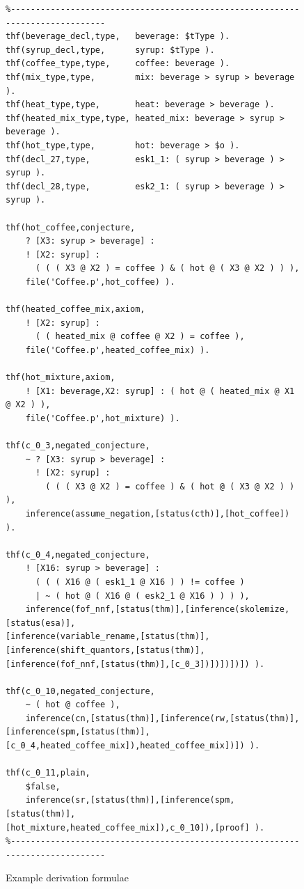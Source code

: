 \documentclass{easychair}
\begin{document}
\begin{figure}[htb]
{\footnotesize
{\setlength{\baselineskip}{3mm}
\begin{verbatim}
%------------------------------------------------------------------------------
thf(beverage_decl,type,   beverage: $tType ).
thf(syrup_decl,type,      syrup: $tType ).
thf(coffee_type,type,     coffee: beverage ).
thf(mix_type,type,        mix: beverage > syrup > beverage ).
thf(heat_type,type,       heat: beverage > beverage ).
thf(heated_mix_type,type, heated_mix: beverage > syrup > beverage ).
thf(hot_type,type,        hot: beverage > $o ).
thf(decl_27,type,         esk1_1: ( syrup > beverage ) > syrup ).
thf(decl_28,type,         esk2_1: ( syrup > beverage ) > syrup ).

thf(hot_coffee,conjecture,
    ? [X3: syrup > beverage] :
    ! [X2: syrup] :
      ( ( ( X3 @ X2 ) = coffee ) & ( hot @ ( X3 @ X2 ) ) ),
    file('Coffee.p',hot_coffee) ).

thf(heated_coffee_mix,axiom,
    ! [X2: syrup] :
      ( ( heated_mix @ coffee @ X2 ) = coffee ),
    file('Coffee.p',heated_coffee_mix) ).

thf(hot_mixture,axiom,
    ! [X1: beverage,X2: syrup] : ( hot @ ( heated_mix @ X1 @ X2 ) ),
    file('Coffee.p',hot_mixture) ).

thf(c_0_3,negated_conjecture,
    ~ ? [X3: syrup > beverage] :
      ! [X2: syrup] :
        ( ( ( X3 @ X2 ) = coffee ) & ( hot @ ( X3 @ X2 ) ) ),
    inference(assume_negation,[status(cth)],[hot_coffee]) ).

thf(c_0_4,negated_conjecture,
    ! [X16: syrup > beverage] :
      ( ( ( X16 @ ( esk1_1 @ X16 ) ) != coffee )
      | ~ ( hot @ ( X16 @ ( esk2_1 @ X16 ) ) ) ),
    inference(fof_nnf,[status(thm)],[inference(skolemize,[status(esa)],
[inference(variable_rename,[status(thm)],[inference(shift_quantors,[status(thm)],
[inference(fof_nnf,[status(thm)],[c_0_3])])])])]) ).

thf(c_0_10,negated_conjecture,
    ~ ( hot @ coffee ),
    inference(cn,[status(thm)],[inference(rw,[status(thm)],
[inference(spm,[status(thm)],[c_0_4,heated_coffee_mix]),heated_coffee_mix])]) ).

thf(c_0_11,plain,
    $false,
    inference(sr,[status(thm)],[inference(spm,[status(thm)],
[hot_mixture,heated_coffee_mix]),c_0_10]),[proof] ).
%------------------------------------------------------------------------------
\end{verbatim}
}}
\caption{Example derivation formulae}
\label{ExampleDerivationFormulae}
\end{figure}
\end{document}
